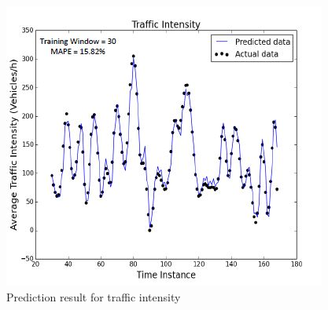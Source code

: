\documentclass[runningheads]{llncs}
\begin{document}
\begin{figure}
	\centering
	\includegraphics[width=0.8\linewidth]{Figure17.jpg}
	\caption{Prediction result for traffic intensity \cite{17}}
	\label{fig:figure15}
\end{figure}
\end{document}
